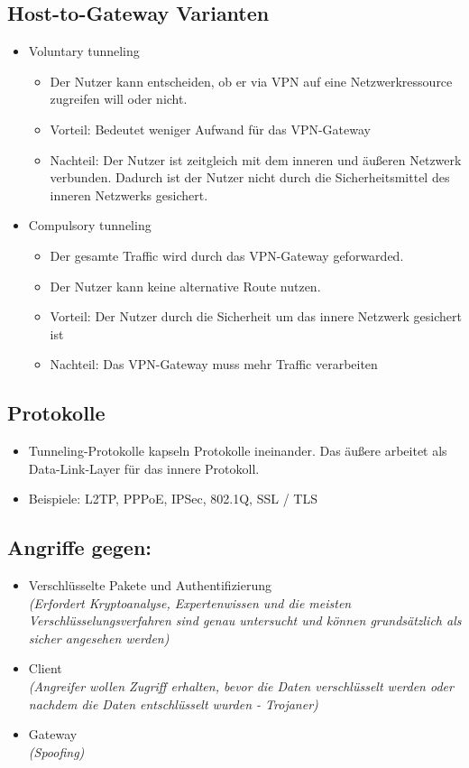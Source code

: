 \documentclass{article} %
\begin{document}
\subsection{Host-to-Gateway Varianten}
		\begin{itemize}
		\item Voluntary tunneling
			\begin{itemize}
			\item Der Nutzer kann entscheiden, ob er via VPN auf eine Netzwerkressource zugreifen will oder nicht.
			\item Vorteil: Bedeutet weniger Aufwand für das VPN-Gateway
			\item Nachteil: Der Nutzer ist zeitgleich mit dem inneren und äußeren Netzwerk verbunden. Dadurch ist der Nutzer nicht durch die Sicherheitsmittel des inneren Netzwerks gesichert.
			\end{itemize}
		\item Compulsory tunneling
			\begin{itemize}
			\item Der gesamte Traffic wird durch das VPN-Gateway geforwarded.
			\item Der Nutzer kann keine alternative Route nutzen.
			\item Vorteil: Der Nutzer durch die Sicherheit um das innere Netzwerk gesichert ist
			\item Nachteil: Das VPN-Gateway muss mehr Traffic verarbeiten
			\end{itemize}		
		\end{itemize}
\subsection{Protokolle}
	\begin{itemize}
	\item Tunneling-Protokolle kapseln Protokolle ineinander. Das äußere arbeitet als Data-Link-Layer für das innere Protokoll.
	\item Beispiele: L2TP, PPPoE, IPSec, 802.1Q, SSL / TLS
	\end{itemize}
\subsection{Angriffe gegen:}
	\begin{itemize}
	\item Verschlüsselte Pakete und Authentifizierung\\
	\textit{(Erfordert Kryptoanalyse, Expertenwissen und die meisten Verschlüsselungsverfahren sind genau untersucht und können grundsätzlich als sicher angesehen werden)}
	\item Client\\
	\textit{(Angreifer wollen Zugriff erhalten, bevor die Daten verschlüsselt werden oder nachdem die Daten entschlüsselt wurden - Trojaner)}
	\item Gateway\\
	\textit{(Spoofing)}
	\end{itemize}
\end{document}
